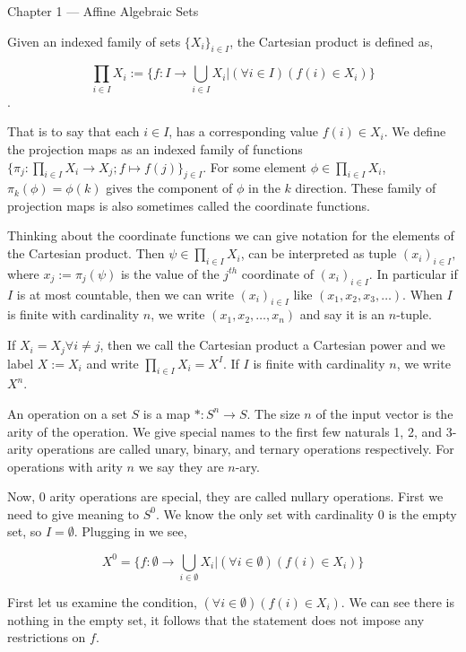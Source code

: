 \documentclass{article}
\begin{document}
\begin{center}
  Chapter 1 --- Affine Algebraic Sets
\end{center}\vspace{1.618em}

Given an indexed family of sets $\{X_i\}_{i \in I}$, the Cartesian product is defined as,

\[\prod_{i \in I} X_i := \{f:I \rightarrow \bigcup_{i\in I} X_i |
  (\forall i\in I)(f(i) \in X_i)\}\].

That is to say that each $i \in I$, has a corresponding value $f(i) \in
X_i$. We define the projection maps as an indexed family of
functions $\{\pi_j:\prod_{i \in I} X_i\rightarrow X_j; f \mapsto
f(j)\}_{j\in I}$. For some element $\phi \in \prod_{i \in I} X_i$,
${\pi}_k(\phi) = \phi(k)$ gives the component of $\phi$ in the $k$
direction. These family of projection maps is also sometimes called the
coordinate functions.

Thinking about the coordinate functions we can give notation for the
elements of the Cartesian product. Then $\psi \in \prod_{i \in I} X_i$, can
be interpreted as tuple $(x_i)_{i\in I},$ where $x_j :=
{\pi}_j(\psi)$ is the value of the $j^{th}$ coordinate of $(x_i)_{i\in I}$. In particular if $I$ is at most countable, then we can
write $(x_i)_{i\in I}$ like $(x_1,x_2,x_3,\dots)$. When $I$ is finite
with cardinality $n$, we write $(x_1,x_2,\dots,x_n)$ and say it is an
$n$-tuple.

If $X_i = X_j \forall i\neq j$, then we call the Cartesian product a
Cartesian power and we label $X := X_i$ and write $\prod_{i\in I} X_i
= X^I$. If $I$ is finite with cardinality $n$, we write $X^n$.

An operation on a set $S$ is a map $*:S^n\rightarrow S$. The size $n$
of the input vector is the arity of the operation. We give special
names to the first few naturals 1, 2, and 3-arity operations are
called unary, binary, and ternary operations respectively. For
operations with arity $n$ we say they are $n$-ary.

Now, 0 arity operations are special, they are called nullary
operations. First we need to give meaning to $S^0$. We know the only set with cardinality $0$ is the empty set, so $I=
\emptyset $. Plugging in we see,

\[X^0 = \{f:\emptyset \rightarrow \bigcup_{i\in \emptyset} X_i | (\forall
  i\in \emptyset)(f(i) \in X_i)\}\]

First let us examine the condition, $(\forall
  i\in \emptyset)(f(i) \in X_i)$. We can see there is nothing in the
  empty set, it follows that the statement does not impose any
  restrictions on $f$.
\end{document}
